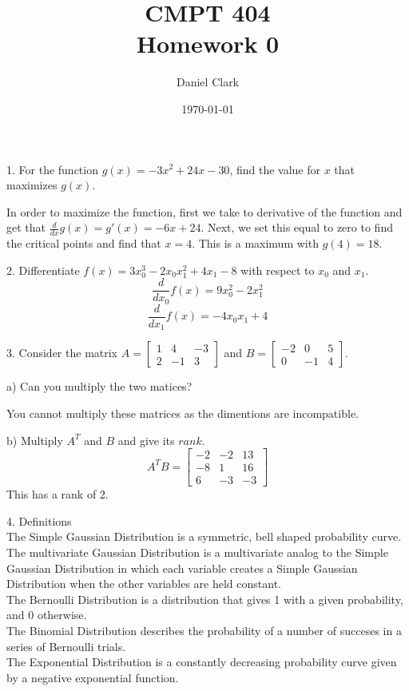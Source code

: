 \documentclass[12pt]{article}
\title{CMPT 404\\Homework 0}
\author{Daniel Clark}
\date{\today}
\begin{document}
\maketitle

\begin{description} 
\begin{doublespace}


\item[1.] For the function $g(x) = -3x^2 + 24x - 30$, find the value for $x$ that maximizes $g(x)$.

In order to maximize the function, first we take to derivative of the function and get that $\frac{d} {dx} g(x) = g'(x) = -6x + 24$. Next, we set this equal to zero to find the critical points and find that  $x = 4$. This is a maximum with $g(4) = 18$.



\item[2.] Differentiate $f(x) = 3x_0^3 - 2 x_0 x_1^2 +4x_1 -8$ with respect to $x_0$ and $x_1$.
\[
	\frac{d}{dx_0} f(x) = 9x_0^2 - 2x_1^2
\]
\[
	\frac{d}{dx_1} f(x) = -4x_0 x_1 + 4
\]

\newpage


\item[3.] Consider the matrix $A =  \begin{bmatrix} 1 & 4 & -3 \\ 2 & -1 & 3\end{bmatrix}$ and $B =  \begin{bmatrix} -2 & 0 & 5 \\ 0 & -1 & 4\end{bmatrix}$.

\item[a)] Can you multiply the two matices?

	You cannot multiply these matrices as the dimentions are incompatible.

\item[b)] Multiply $A^T$ and $B$ and give its $rank$.
\[
	A^TB = \begin{bmatrix} -2 & -2 & 13 \\ -8 & 1 & 16 \\ 6 & -3 & -3 \end{bmatrix}
\]
This has a rank of 2.



\item[4.] Definitions
\\The Simple Gaussian Distribution is a symmetric, bell shaped probability curve.
\\The multivariate Gaussian Distribution is a multivariate analog to the Simple Gaussian Distribution in which each variable creates a Simple Gaussian Distribution when the other variables are held constant.
\\The Bernoulli Distribution is a distribution that gives 1 with a given probability, and 0 otherwise.
\\The Binomial Distribution describes the probability of a number of succeses in a series of Bernoulli trials.
\\The Exponential Distribution is a constantly decreasing probability curve given by a negative exponential function.




\end{doublespace}
\end{description}
\end{document}
